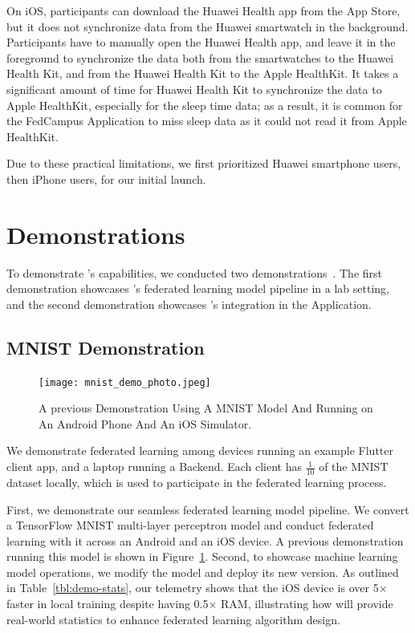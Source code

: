 On iOS, participants can download the Huawei Health app from the App Store,
but it does not synchronize data from the Huawei smartwatch in the background.
Participants have to manually open the Huawei Health app,
and leave it in the foreground to synchronize the data both from
the smartwatches to the Huawei Health Kit,
and from the Huawei Health Kit to the Apple HealthKit.
It takes a significant amount of time for Huawei Health Kit to
synchronize the data to Apple HealthKit,
especially for the sleep time data;
as a result, it is common for the FedCampus Application to miss sleep data as
it could not read it from Apple HealthKit.

Due to these practical limitations,
we first prioritized Huawei smartphone users, then iPhone users,
for our initial launch.

\section{\fedkit Demonstrations}

To demonstrate \fedkit's capabilities,
we conducted two demonstrations~\cite{he2024fedkit}.
The first demonstration showcases \fedkit's federated learning model pipeline in
a lab setting,
and the second demonstration showcases \fedkit's integration in the \fedcampus
Application.

\subsection{\fedkit MNIST Demonstration}

\begin{figure}\begin{center}
        \label{fig:lab}
        \texttt{[image: mnist\_demo\_photo.jpeg]}
        \caption{A previous \fedkit Demonstration Using A MNIST Model And
            Running on An Android Phone And An iOS Simulator.
        }
    \end{center}\end{figure}

We demonstrate federated learning among
devices running an example Flutter client app,
and a laptop running a \fedkit Backend. Each client has $\frac{1}{10}$ of the
MNIST~\cite{deng2012mnist} dataset locally,
which is used to participate in the federated learning process.

First, we demonstrate our seamless federated learning model pipeline.
We convert a TensorFlow MNIST multi-layer perceptron model and
conduct federated learning with it across an Android and an iOS device.
A previous demonstration running this model is shown in Figure~\ref{fig:lab}.
Second, to showcase machine learning model operations,
we modify the model and deploy its new version.
As outlined in Table~\ref{tbl:demo-stats},
our telemetry shows that
the iOS device is over 5$\times$ faster in local training despite
having 0.5$\times$ RAM,
illustrating how \fedkit will provide real-world statistics to
enhance federated learning algorithm design.

